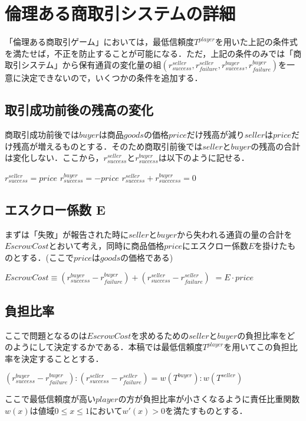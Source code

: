 \section{倫理ある商取引システムの詳細}
「倫理ある商取引ゲーム」においては，最低信頼度$ T^{player} $を用いた上記の条件式を満たせば，不正を防止することが可能になる．ただ，上記の条件のみでは「商取引システム」から保有通貨の変化量の組$ (r^{seller}_{success}, r^{seller}_{failure}, r^{buyer}_{success}, r^{buyer}_{failure}) $を一意に決定できないので，いくつかの条件を追加する．


\subsection{取引成功前後の残高の変化}
商取引成功前後では$ buyer $は商品$ goods $の価格$ price $だけ残高が減り$ seller $は$ price $だけ残高が増えるものとする．そのため商取引前後では$ seller $と$ buyer $の残高の合計は変化しない．ここから，$ r^{seller}_{success} $と$ r^{buyer}_{success} $は以下のように記せる．

$ r^{seller}_{success} = price $
$ r^{buyer}_{success} = -price $
$ r^{seller}_{success} + r^{buyer}_{succcess} = 0 $

\subsection{エスクロー係数 E}
まずは「失敗」が報告された時に$ seller $と$ buyer $から失われる通貨の量の合計を$ EscrowCost $とおいて考え，同時に商品価格$ price $にエスクロー係数$ E $を掛けたものとする．(ここで$ price $は$ goods $の価格である)

$ EscrowCost \equiv (r^{buyer}_{success} - r^{buyer}_{failure}) + (r^{seller}_{success} - r^{seller}_{failure}) $
$ = E \cdot price $

\subsection{負担比率}
ここで問題となるのは$ EscrowCost $を求めるための$ seller $と$ buyer $の負担比率をどのようにして決定するかである．本稿では最低信頼度$ T^{player} $を用いてこの負担比率を決定することとする．

$ (r^{buyer}_{success} - r^{buyer}_{failure}):(r^{seller}_{success} - r^{seller}_{failure}) = w(T^{buyer}):w(T^{seller}) $

ここで最低信頼度が高い$ player $の方が負担比率が小さくなるように責任比重関数$ w(x) $は値域$ 0 \leq  x \leq 1 $において$ w'(x)>0 $を満たすものとする．

